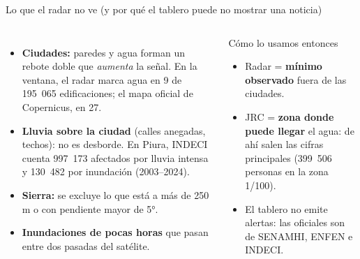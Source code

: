 \documentclass[aspectratio=169,11pt]{beamer}
\begin{document}
\begin{frame}{Lo que el radar no ve (y por qué el tablero puede no mostrar una noticia)}
\begin{columns}[T]
\small
\begin{itemize}\setlength\itemsep{4pt}
\item \textbf{Ciudades:} paredes y agua forman un rebote doble que \emph{aumenta} la señal. En la ventana, el radar marca agua en 9 de 195~065 edificaciones; el mapa oficial de Copernicus, en 27.
\item \textbf{Lluvia sobre la ciudad} (calles anegadas, techos): no es desborde. En Piura, INDECI cuenta 997~173 afectados por lluvia intensa y 130~482 por inundación (2003--2024).
\item \textbf{Sierra:} se excluye lo que está a más de 250 m o con pendiente mayor de 5°.
\item \textbf{Inundaciones de pocas horas} que pasan entre dos pasadas del satélite.
\end{itemize}
\begin{block}{Cómo lo usamos entonces}
\small
\begin{itemize}
\item Radar = \textbf{mínimo observado} fuera de las ciudades.
\item JRC = \textbf{zona donde puede llegar} el agua: de ahí salen las cifras principales (399~506 personas en la zona 1/100).
\item El tablero no emite alertas: las oficiales son de SENAMHI, ENFEN e INDECI.
\end{itemize}
\end{block}
\end{columns}
\end{frame}
\end{document}
